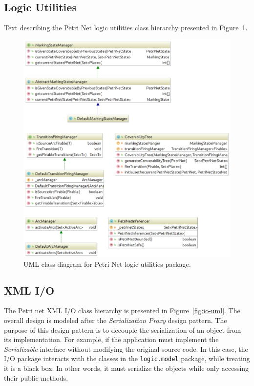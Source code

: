 \subsection{Logic Utilities}
Text describing the Petri Net logic utilities class hierarchy presented in Figure~\ref{fig:logic-util-uml}.

\begin{figure}
	\centering
	\includegraphics[width=1.0\columnwidth]{figures/logic-util-uml}
	\caption{UML class diagram for Petri Net logic utilities package.\label{fig:logic-util-uml}}
\end{figure}

\subsection{XML I/O}
The Petri net XML I/O class hierarchy is presented in Figure~\ref{fig:io-uml}.
The overall design is modeled after the \textit{Serialization Proxy} design
pattern. The purpose of this design pattern is to decouple the serialization
of an object from its implementation. For example, if the application must implement
the \textit{Serializable} interface without modifying the original source code.
In this case, the I/O package interacts with the classes in the \texttt{logic.model}
package, while treating it is a black box. In other words, it must serialize the
objects while only accessing their public methods.

